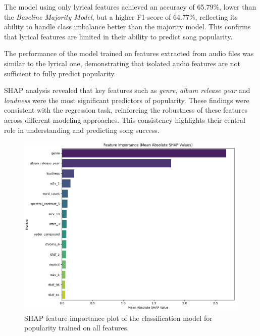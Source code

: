 The model using only lyrical features achieved an accuracy of 65.79\%, lower
than the \textit{Baseline Majority Model}, but a higher F1-score of 64.77\%,
reflecting its ability to handle class imbalance better than the majority
model. This confirms that lyrical features are limited in their ability to
predict song popularity.


The performance of the model trained on features extracted from audio files was
similar to the lyrical one, demonstrating that isolated audio features are not
sufficient to fully predict popularity.


SHAP analysis revealed that key features such as \textit{genre}, \textit{album
release year} and \textit{loudness} were the most
significant predictors of popularity. These findings were consistent with the
regression task, reinforcing the robustness of these features across different
modeling approaches. This consistency highlights their central role in
understanding and predicting song success.


\begin{center}
\begin{figure}[H]
  \centering
  \includegraphics[width=5in]{img/feature_importance_popularity_clf.png}
  \caption{SHAP feature importance plot of the classification model for popularity trained on all features.}
  \label{Figure:fig_beh}
\end{figure}
\end{center}

